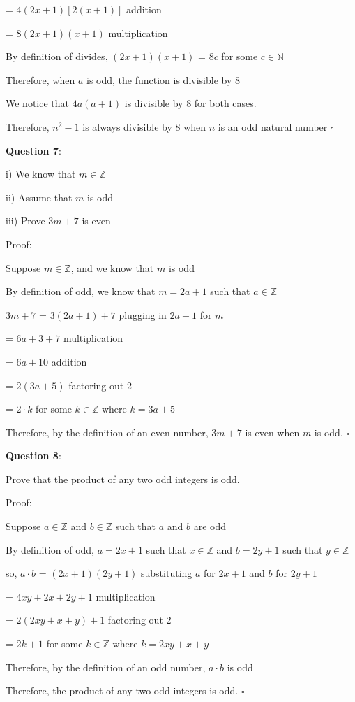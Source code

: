 \documentclass{article} %
\newcommand{\question}[2][]{\begin{flushleft}
        \textbf{Question #1}: \textit{#2}

\end{flushleft}}
\begin{document}
    \tabto*{2.08cm} = $4(2x + 1)[2(x + 1)]$ \tabto*{6cm}addition

    \tabto*{2.08cm} = $8(2x + 1)(x + 1)$ \tabto*{6cm}multiplication

    By definition of divides, $(2x + 1)(x+1)$ = $8c$ for some $c \in \mathbb{N}$

    Therefore, when $a$ is odd, the function is divisible by 8

    \vspace*{0.3cm}

    We notice that $4a(a+1)$ is divisible by 8 for both cases.

    Therefore, $n^2 -1$ is always divisible by 8 when $n$ is an odd natural number $\square$

    \question[7]{}

    i) We know that $m \in \mathbb{Z}$

    ii) Assume that $m$ is odd

    iii) Prove $3m + 7$ is even

    \vspace*{0.3cm}
    Proof:

    Suppose $m \in \mathbb{Z}$, and we know that $m$ is odd
    
    By definition of odd, we know that $m = 2a+1$ such that $a \in \mathbb{Z}$

    $3m + 7$ = $3(2a + 1) + 7$ \tabto*{5cm}plugging in $2a + 1$ for $m$

    \tabto*{1.75cm} = $6a + 3 + 7$ \tabto*{5cm}multiplication

    \tabto*{1.75cm} = $6a + 10$ \tabto*{5cm}addition

    \tabto*{1.75cm} = $2(3a + 5)$ \tabto*{5cm}factoring out 2

    \tabto*{1.75cm} = $2\cdot k$ for some $k \in \mathbb{Z}$ where $k = 3a + 5$

    Therefore, by the definition of an even number, $3m + 7$ is even when $m$ is odd. $\square$

    \newpage

    \question[8]{}

    Prove that the product of any two odd integers is odd.

    Proof:

    Suppose $a \in \mathbb{Z}$ and $b \in \mathbb{Z}$ such that $a$ and $b$ are odd

    By definition of odd, $a = 2x + 1$ such that $x \in \mathbb{Z}$ and $b = 2y + 1$ such that $y \in \mathbb{Z}$

    so, $a \cdot b$ = $(2x + 1)(2y + 1)$ substituting $a$ for $2x + 1$ and $b$ for $2y + 1$

    \tabto*{1.78cm} = $4xy + 2x + 2y + 1$ multiplication

    \tabto*{1.78cm} = $2(2xy + x + y) + 1$ factoring out 2

    \tabto*{1.78cm} = $2k + 1$ for some $k \in \mathbb{Z}$ where $k = 2xy + x + y$

    Therefore, by the definition of an odd number, $a \cdot b$ is odd

    Therefore, the product of any two odd integers is odd. $\square$



    
\end{document}
